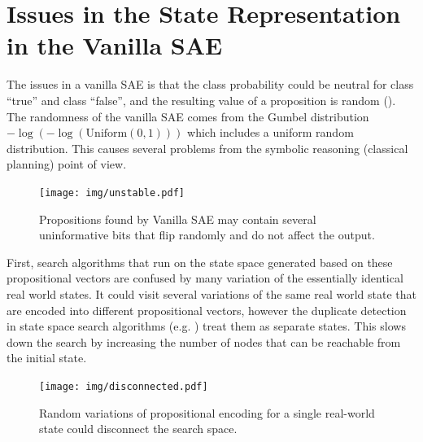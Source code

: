 

\section{Issues in the State Representation\\ in the Vanilla SAE}
\label{issues}

The issues in a vanilla SAE is that the class probability could be
neutral for class ``true'' and class ``false'', and the resulting value
of a proposition is random ().
The randomness of the vanilla SAE comes from
the Gumbel distribution $-\log (-\log (\text{Uniform}(0,1)))$ which includes
a uniform random distribution.
This causes several problems from the symbolic reasoning (classical planning) point of view.

\begin{figure}[htb]
 \centering
 \texttt{[image: img/unstable.pdf]}
 \caption{Propositions found by Vanilla SAE may contain several uninformative bits
 that flip randomly and do not affect the output.}
 \label{unstable}
\end{figure}

First, search algorithms that run on the state space generated based on these propositional vectors
are confused by many variation of the essentially identical real world states.
It could visit several variations of the same real world state that are encoded into different propositional vectors,
however the duplicate detection in state space search algorithms (e.g. \astar) treat them as separate states.
This slows down the search by increasing the number of nodes that can be reachable from the initial state.

\begin{figure}[htb]
 \centering
 \texttt{[image: img/disconnected.pdf]}
 \caption{Random variations of propositional encoding for a single real-world state could disconnect the search space.}
 \label{disconnected}
\end{figure}


